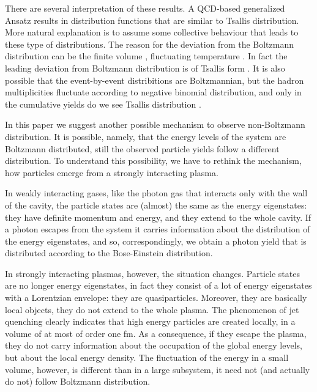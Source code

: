 \documentclass[aps,prd,twocolumn,showpacs,superscriptaddress,groupedaddress]{revtex4}  %
\begin{document}

There are several interpretation of these results. A QCD-based
generalized Ansatz
\cite{Hagedorn1, Wong:2014uda, Wong:2015mba} results in
distribution functions that are similar to Tsallis distribution. More
natural explanation is to assume some collective behaviour that leads
to these type of distributions. The reason for the deviation from the
Boltzmann distribution can be the finite volume \cite{Biro:2012bka},
fluctuating temperature \cite{Wilk:2012zn, Biro:2014fna}. In fact
the leading deviation from Boltzmann distribution is of Tsallis
form \cite{GyorgyiG}.  It is also possible that the event-by-event
distribitions are Boltzmannian, but the hadron multiplicities
fluctuate according to negative binomial distribution, and only in the
cumulative yields do we see Tsallis distribution
\cite{Urmossy:2015kva}.

%

In this paper we suggest another possible mechanism to observe
non-Boltzmann distribution. It is possible, namely, that the energy
levels of the system are Boltzmann distributed, still the observed
particle yields follow a different distribution. To understand this
possibility, we have to rethink the mechanism, how particles emerge
from a strongly interacting plasma.

In weakly interacting gases, like the photon gas that interacts only
with the wall of the cavity, the particle states are (almost) the same
as the energy eigenstates: they have definite momentum and energy, and
they extend to the whole cavity. If a photon escapes from the system
it carries information about the distribution of the energy
eigenstates, and so, correspondingly, we obtain a photon yield that is
distributed according to the Bose-Einstein distribution.

In strongly interacting plasmas, however, the situation
changes. Particle states are no longer energy eigenstates, in fact
they consist of a lot of energy eigenstates with a Lorentzian
envelope: they are quasiparticles. Moreover, they are basically local
objects, they do not extend to the whole plasma. The phenomenon of jet
quenching \cite{Wiedemann:2009sh} clearly indicates that high energy
particles are created locally, in a volume of at most of order one
fm. As a consequence, if they escape the plasma, they do not carry
information about the occupation of the global energy levels, but
about the local energy density. The fluctuation of the energy in a
small volume, however, is different than in a large subsystem, it need
not (and actually do not) follow Boltzmann distribution.
\end{document}
